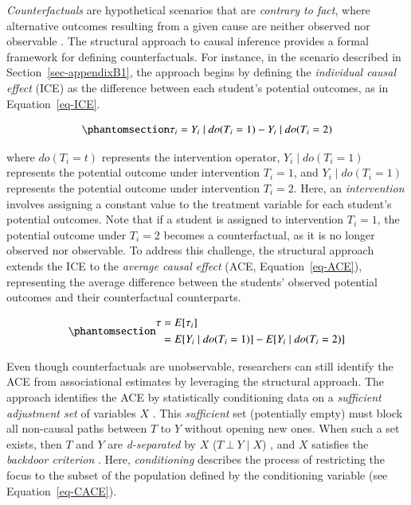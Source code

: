 \documentclass[
  authoryear,
  review,
  1p]{elsarticle}
\begin{document}
\emph{Counterfactuals} are hypothetical scenarios that are
\emph{contrary to fact}, where alternative outcomes resulting from a
given cause are neither observed nor observable
\citep{Neal_2020, Counterfactual_2024}. The structural approach to
causal inference \citep{Pearl_2009, Pearl_et_al_2016} provides a formal
framework for defining counterfactuals. For instance, in the scenario
described in Section~\ref{sec-appendixB1}, the approach begins by
defining the \emph{individual causal effect} (ICE) as the difference
between each student's potential outcomes, as in Equation~\ref{eq-ICE}.

\begin{equation}\phantomsection\label{eq-ICE}{
\tau_{i} = Y_{i} \mid do(T_{i}=1) - Y_{i} \mid do(T_{i}=2)
}\end{equation}

where \(do(T_{i}=t)\) represents the intervention operator,
\(Y_{i} \mid do(T_{i}=1)\) represents the potential outcome under
intervention \(T_{i}=1\), and \(Y_{i} \mid do(T_{i}=1)\) represents the
potential outcome under intervention \(T_{i}=2\). Here, an
\emph{intervention} involves assigning a constant value to the treatment
variable for each student's potential outcomes. Note that if a student
is assigned to intervention \(T_{i}=1\), the potential outcome under
\(T_{i}=2\) becomes a counterfactual, as it is no longer observed nor
observable. To address this challenge, the structural approach extends
the ICE to the \emph{average causal effect} (ACE,
Equation~\ref{eq-ACE}), representing the average difference between the
students' observed potential outcomes and their counterfactual
counterparts.

\begin{equation}\phantomsection\label{eq-ACE}{
\begin{aligned}
\tau & = E[\tau_{i}] \\
  & = E[Y_{i} \mid do(T_{i}=1)]- E[Y_{i} \mid do(T_{i}=2)]
\end{aligned}
}\end{equation}

Even though counterfactuals are unobservable, researchers can still
identify the ACE from associational estimates by leveraging the
structural approach. The approach identifies the ACE by statistically
conditioning data on a \emph{sufficient adjustment set} of variables
\(X\) \citep{Pearl_2009, Pearl_et_al_2016, Morgan_et_al_2014}. This
\emph{sufficient} set (potentially empty) must block all non-causal
paths between \(T\) to \(Y\) without opening new ones. When such a set
exists, then \(T\) and \(Y\) are \emph{d-separated} by \(X\)
(\(T \:\bot\:Y \mid X\)) \citep{Pearl_2009}, and \(X\) satisfies the
\emph{backdoor criterion} \citep[pp 37]{Neal_2020}. Here,
\emph{conditioning} describes the process of restricting the focus to
the subset of the population defined by the conditioning variable
\citep[p.~32]{Neal_2020} (see Equation~\ref{eq-CACE}).
\end{document}
